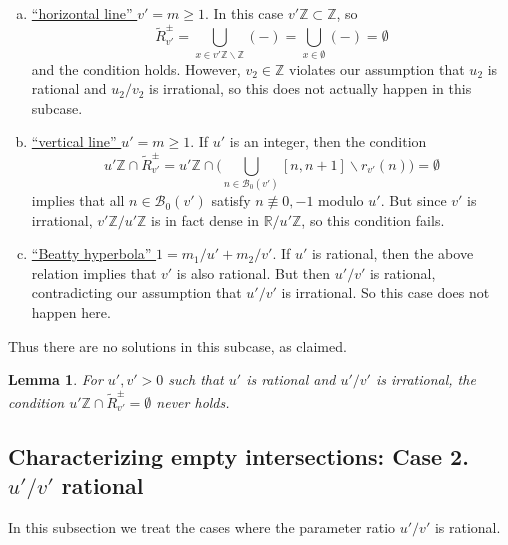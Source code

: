 \documentclass[12pt,letterpaper, reqno]{amsart}
\newtheorem{lem}[thm]{Lemma}
\theoremstyle{definition}
\theoremstyle{remark}
\newcommand{\RR}{\ensuremath{\mathbb{R}}}
\newcommand{\ZZ}{\ensuremath{\mathbb{Z}}}
\newcommand{\uu}{{u'}}
\newcommand{\vv}{{v'}}
\newcommand{\sB}{{\mathcal B}}
\begin{document}
\begin{enumerate}[(a)]
\item \underline{``horizontal line'' $\vv = m\geq 1$}. In this case $\vv\ZZ\subset \ZZ$, so 
\[ \widetilde{R}_{\vv}^\pm = \bigcup_{x\in \vv\ZZ \smallsetminus \ZZ} (-) = \bigcup_{x\in\emptyset} (-) =\emptyset\]
and the condition holds.
However, $v_2\in\ZZ$ violates our assumption that $u_2$ is rational and $u_2/v_2$ is irrational, so this does not actually happen in this subcase.

\item \underline{``vertical line'' $\uu = m\geq 1$}.
If $\uu$ is an integer, then the condition
\[ \uu\ZZ\cap \widetilde{R}_{\vv}^\pm = \uu\ZZ\cap \bigg(\bigcup_{n\in \sB_0(\vv)} [n, n+1] \smallsetminus r_{\vv}(n) \bigg) =\emptyset\]
implies that all $n\in \sB_0(\vv)$ satisfy $n \not\equiv 0, -1$ modulo $\uu$. But since $\vv$ is irrational, $\vv\ZZ/\uu\ZZ$ is in fact dense in $\RR/\uu\ZZ$, so this condition fails.

\item \underline{``Beatty hyperbola'' $1 = m_1/\uu + m_2/\vv$}. 
If $\uu$ is rational, then the above relation implies that $\vv$ is also rational. But then $\uu/\vv$ is rational, contradicting our assumption that $\uu/\vv$ is irrational. So this case does not happen here.

\end{enumerate}
Thus there are no solutions in this subcase, as claimed.

\begin{lem}\label{lem:55}
For $\uu,\vv>0$ such that $\uu$ is rational and $\uu/\vv$ is irrational, the condition $\uu\ZZ\cap \widetilde{R}^\pm_\vv = \emptyset$ never holds.
\end{lem}

%
%
\subsection{Characterizing empty intersections: Case 2. $\uu/\vv$ rational}\label{sec:uv-rational}
In this subsection we treat the cases where the parameter ratio $\uu/\vv$ is rational. 
\end{document}

